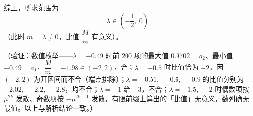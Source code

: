 \begin{answer}
综上，所求范围为
\nopagebreak[4]
\[
\lambda\in\left(-\frac{1}{2},\ 0\right)
\]
（此时 \(m=\lambda\neq0\)，比值 \(\dfrac{M}{m}\) 有意义）。

（验证：数值枚举——\(\lambda=-0.49\) 时前 200 项的最大值 \(0.9702=a_{2}\)、最小值 \(-0.49=a_{1}\)，\(\dfrac{M}{m}=-1.98\in(-2,2)\)，合；\(\lambda=-0.5\) 时比值恰为 \(-2\)，因 \((-2,2)\) 为开区间而不合（端点排除）；\(\lambda=-0.51,\ -0.6,\ -0.9\) 的比值分别为 \(-2.02,\ -2.2,\ -2.8\)，均不合；\(\lambda=-1\) 给 \(-3\)，不合；\(\lambda=-1.5,\ -2\) 时偶数项按 \(\mu^{2k}\) 发散、奇数项按 \(-\mu^{2k-1}\) 发散，有限前缀上算出的「比值」无意义，数列确无最值。以上与解析结论一致。）




\end{answer}
